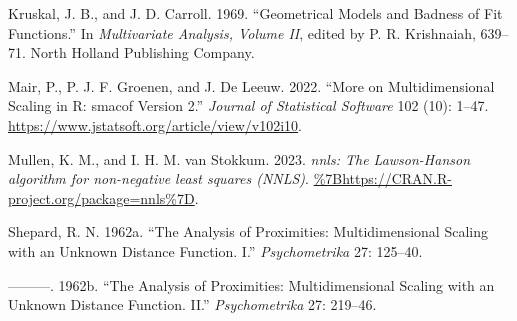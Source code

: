 \documentclass[
  12pt,
]{article}
\newlength{\cslhangindent}
\newenvironment{CSLReferences}[2] %
 {\begin{list}{}{%
  \setlength{\itemindent}{0pt}
  \setlength{\leftmargin}{0pt}
  \setlength{\parsep}{0pt}
  \ifodd #1
   \setlength{\leftmargin}{\cslhangindent}
   \setlength{\itemindent}{-1\cslhangindent}
  \fi
  \setlength{\itemsep}{#2\baselineskip}}}
 {\end{list}}
\begin{document}
\begin{CSLReferences}{1}{0}
Kruskal, J. B., and J. D. Carroll. 1969. {``{Geometrical Models and Badness of Fit Functions}.''} In \emph{Multivariate Analysis, Volume II}, edited by P. R. Krishnaiah, 639--71. North Holland Publishing Company.

Mair, P., P. J. F. Groenen, and J. De Leeuw. 2022. {``{More on Multidimensional Scaling in R: smacof Version 2}.''} \emph{Journal of Statistical Software} 102 (10): 1--47. \url{https://www.jstatsoft.org/article/view/v102i10}.

Mullen, K. M., and I. H. M. van Stokkum. 2023. \emph{{nnls: The Lawson-Hanson algorithm for non-negative least squares (NNLS)}}. \url{\%7Bhttps://CRAN.R-project.org/package=nnls\%7D}.

Shepard, R. N. 1962a. {``{The Analysis of Proximities: Multidimensional Scaling with an Unknown Distance Function. I}.''} \emph{Psychometrika} 27: 125--40.

---------. 1962b. {``{The Analysis of Proximities: Multidimensional Scaling with an Unknown Distance Function. II}.''} \emph{Psychometrika} 27: 219--46.

\end{CSLReferences}
\end{document}
